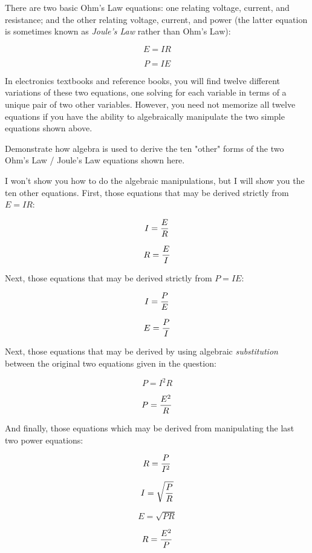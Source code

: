 

There are two basic Ohm's Law equations: one relating voltage, current, and resistance; and the other relating voltage, current, and power (the latter equation is sometimes known as {\it Joule's Law} rather than Ohm's Law):

$$E = I R$$

$$P = I E$$

In electronics textbooks and reference books, you will find twelve different variations of these two equations, one solving for each variable in terms of a unique pair of two other variables.  However, you need not memorize all twelve equations if you have the ability to algebraically manipulate the two simple equations shown above.

Demonstrate how algebra is used to derive the ten "other" forms of the two Ohm's Law / Joule's Law equations shown here.







I won't show you how to do the algebraic manipulations, but I will show you the ten other equations.  First, those equations that may be derived strictly from $E = I R$:

$$I = {E \over R}$$

$$R = {E \over I}$$

Next, those equations that may be derived strictly from $P = I E$:

$$I = {P \over E}$$

$$E = {P \over I}$$

Next, those equations that may be derived by using algebraic {\it substitution} between the original two equations given in the question:

$$P = I^2 R$$

$$P = {E^2 \over R}$$

And finally, those equations which may be derived from manipulating the last two power equations:

$$R = {P \over I^2}$$

$$I = \sqrt{P \over R}$$

$$E = \sqrt{P R}$$

$$R = {E^2 \over P}$$

